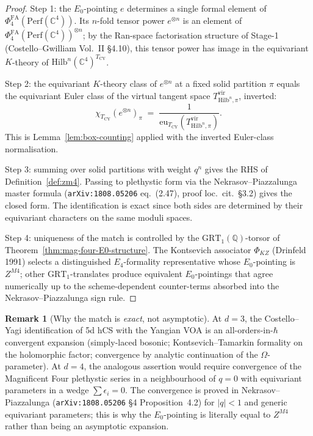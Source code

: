 \documentclass[11pt]{article}
\providecommand{\C}{\mathbb{C}}
\providecommand{\Perf}{\mathrm{Perf}}
\providecommand{\Hilb}{\mathrm{Hilb}}
\providecommand{\Ezero}{E_0}
\providecommand{\PhiFA}{\Phi^{\mathrm{FA}}}
\theoremstyle{definition}
\newtheorem{remark}[theorem]{Remark}
\begin{document}
\begin{proof}
Step 1: the $\Ezero$-pointing $e$ determines a single formal element
of $\PhiFA_4(\Perf(\C^4))$. Its $n$-fold tensor power $e^{\otimes n}$
is an element of $\PhiFA_4(\Perf(\C^4))^{\otimes n}$; by the
Ran-space factorisation structure of Stage-1 (Costello--Gwilliam
Vol.~II \S 4.10), this tensor power has image in the equivariant
$K$-theory of $\Hilb^n(\C^4)^{T_{\mathrm{CY}}}$.

Step 2: the equivariant $K$-theory class of $e^{\otimes n}$ at a fixed
solid partition $\pi$ equals the equivariant Euler class of the
virtual tangent space $T^{\mathrm{vir}}_{\Hilb^n, \pi}$, inverted:
\[
  \chi_{T_{\mathrm{CY}}}(e^{\otimes n})_\pi
  \;=\; \frac{1}{\mathrm{eu}_{T_{\mathrm{CY}}}(T^{\mathrm{vir}}_{\Hilb^n, \pi})}.
\]
This is Lemma~\ref{lem:box-counting} applied with the inverted
Euler-class normalisation.

Step 3: summing over solid partitions with weight $q^n$ gives the RHS
of Definition~\ref{def:zm4}. Passing to plethystic form via the
Nekrasov--Piazzalunga master formula (\texttt{arXiv:1808.05206}
eq.~(2.47), proof loc.\ cit.~\S 3.2) gives the closed form. The
identification is exact since both sides are determined by their
equivariant characters on the same moduli spaces.

Step 4: uniqueness of the match is controlled by the
$\mathrm{GRT}_1(\mathbb{Q})$-torsor of
Theorem~\ref{thm:mag-four-E0-structure}. The
Kontsevich associator $\Phi_{KZ}$ (Drinfeld 1991) selects a
distinguished $E_4$-formality representative whose $\Ezero$-pointing
is $Z^{M4}$; other $\mathrm{GRT}_1$-translates produce equivalent
$\Ezero$-pointings that agree numerically up to the
scheme-dependent counter-terms absorbed into the Nekrasov--Piazzalunga
sign rule.
\end{proof}

\begin{remark}[Why the match is \emph{exact}, not asymptotic]
\label{rem:exact-match}
At $d = 3$, the Costello--Yagi identification of 5d hCS with the
Yangian VOA is an all-orders-in-$\hbar$ convergent expansion
(simply-laced bosonic; Kontsevich--Tamarkin formality on the
holomorphic factor; convergence by analytic continuation of the
$\Omega$-parameter). At $d = 4$, the analogous assertion would
require convergence of the Magnificent Four plethystic series in
a neighbourhood of $q = 0$ with equivariant parameters in a wedge
$\sum \epsilon_i = 0$.
The convergence is proved in Nekrasov--Piazzalunga
(\texttt{arXiv:1808.05206} \S 4 Proposition~4.2) for
$|q| < 1$ and generic equivariant parameters; this is why the
$E_0$-pointing is literally equal to $Z^{M4}$ rather than being an
asymptotic expansion.
\end{remark}
\end{document}
